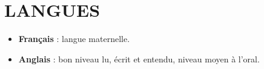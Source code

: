 \section{LANGUES}

\vspace{0.75cm}

\begin{itemize}
  \item \textbf{Français} : langue maternelle.
  \item \textbf{Anglais} : bon niveau lu, écrit et entendu, niveau moyen à l'oral.
\end{itemize}
